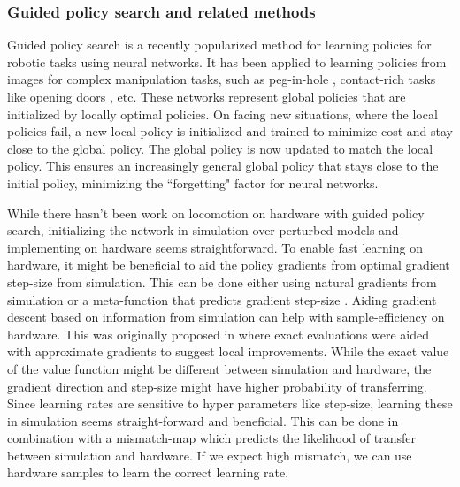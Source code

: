 
\subsubsection{Guided policy search and related methods}

Guided policy search is a recently popularized method for learning policies for robotic tasks \citep{levine2013guided} using neural networks. It has been applied to learning policies from images for complex manipulation tasks, such as peg-in-hole \cite{levine2016end}, contact-rich tasks like opening doors \cite{levine2015learning}, etc. These networks represent global policies that are initialized by locally optimal policies. On facing new situations, where the local policies fail, a new local policy is initialized and trained to minimize cost and stay close to the global policy. The global policy is now updated to match the local policy. This ensures an increasingly general global policy that stays close to the initial policy, minimizing the ``forgetting" factor for neural networks. 

While there hasn't been work on locomotion on hardware with guided policy search, initializing the network in simulation over perturbed models and implementing on hardware seems straightforward. To enable fast learning on hardware, it might be beneficial to aid the policy gradients from optimal gradient step-size from simulation. This can be done either using natural gradients \cite{peters2006policy} from simulation or a meta-function that predicts gradient step-size \cite{meier2017online}. Aiding gradient descent based on information from simulation can help with sample-efficiency on hardware. This was originally proposed in \cite{abbeel2006using} where exact evaluations were aided with approximate gradients to suggest local improvements. While the exact value of the value function might be different between simulation and hardware, the gradient direction and step-size might have higher probability of transferring. Since learning rates are sensitive to hyper parameters like step-size, learning these in simulation seems straight-forward and beneficial. This can be done in combination with a mismatch-map which predicts the likelihood of transfer between simulation and hardware. If we expect high mismatch, we can use hardware samples to learn the correct learning rate.